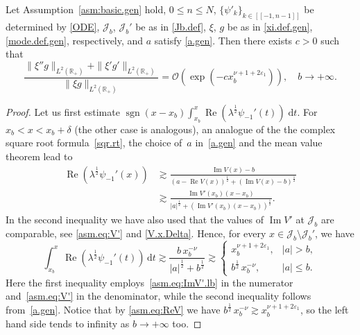 \begin{Proposition}\label{prop:cut.gen}
	Let Assumption~\ref{asm:basic.gen} hold, $0 \leq n \leq N$, $\{\psi'_k\}_{k\in[[-1,n-1]]}$ be determined by \eqref{ODE}, ${\mathcal J}_b$, ${\mathcal J}_b'$ be as in \eqref{Jb.def}, $\xi$, $g$ be as in \eqref{xi.def.gen}, \eqref{mode.def.gen}, respectively,  and $a$ satisfy \eqref{a.gen}.
		Then there exists $c>0$ such that
		\begin{equation}\label{cut.rates.gen}
	\frac{\|\xi'' g\|_{L^2({\mathbb{R}}_+)} + \|\xi' g'\|_{L^2({\mathbb{R}}_+)}}{\|\xi g\|_{L^2({\mathbb{R}}_+)}} 
	= {\mathcal{O}}(\exp(-c x_b^{\nu+1 +2{\varepsilon}_1})), \quad b \to + \infty.
	\end{equation}
\end{Proposition}
\begin{proof}
Let us first estimate 
${\mathop{\mathrm{sgn}}\nolimits}(x -x_b) \int_{x_b}^x {\operatorname{Re}} (\lambda^\frac 12 \psi_{-1}'(t)) \; {\mathrm{d}} t$. 
For $x_b < x <  x_b+\delta$ (the other case is analogous), 
an analogue of the the complex square root formula~\eqref{sqr.rt}, 
the choice of~$a$ in~\eqref{a.gen} 
and the mean value theorem lead to 
\begin{equation}\label{Re.psi-1.gen}
\begin{aligned}
{\operatorname{Re}} (\lambda^\frac 12 \psi_{-1}'(x))
& 
{\gtrsim}
\frac{{\operatorname{Im}} V(x) - b}{(a-{\operatorname{Re}} V(x))^\frac12 + ({\operatorname{Im}} V(x)-b)^\frac 12} 
\\
& {\gtrsim}
\frac{{\operatorname{Im}} V'(x_b)(x-x_b)}{|a|^\frac12 + ({\operatorname{Im}} V'(x_b)(x-x_b))^\frac12}. 
\end{aligned}
\end{equation}
In the second inequality
we have also used that the values of ${\operatorname{Im}} V'$ at ${\mathcal J}_b$ are comparable, 
see \eqref{asm.eq:V'} and \eqref{V.x.Delta}. 
Hence, for every $ x \in {\mathcal J}_b \setminus {\mathcal J}_b'$, 
we have  
\begin{equation}\label{general.-1est}
\int_{x_b}^x{\operatorname{Re}} (\lambda^\frac 12 \psi_{-1}'(t)) \, {\mathrm{d}} t
{\gtrsim}
\frac{b \, x_b^{-\nu}}{|a|^\frac12 + b^\frac 12}
{\gtrsim} 
\begin{cases}
x_b^{\nu+1 +2{\varepsilon}_1}, & |a|>b,
\\[1mm]
b^\frac12 \,  x_b^{-\nu}, & |a| \leq b.
\end{cases}
\end{equation}
Here the first inequality employs~\eqref{asm.eq:ImV'.lb}
in the numerator and~\eqref{asm.eq:V'} in the denominator,
while the second inequality follows from~\eqref{a.gen}.
Notice that by \eqref{asm.eq:ReV} we have 
$b^\frac12 \,  x_b^{-\nu} {\gtrsim} x_b^{\nu+1 +2{\varepsilon}_1}$,
so the left hand side tends to infinity
as $b \to +\infty$ too.


\end{proof}
